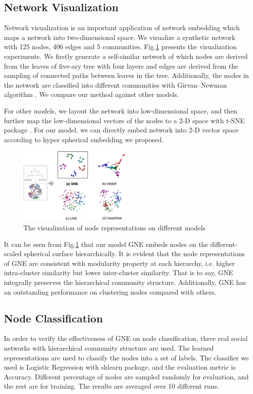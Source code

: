 \documentclass{article}
\theoremstyle{definition}
\begin{document}
	\subsection{Network Visualization}
	Network visualization is an important application of network embedding which maps a network into two-dimensional space. We visualize a synthetic network with 125 nodes, 406 edges and 5 communities. Fig.\ref{fig:visualization} presents the visualization experiments. We firstly generate a self-similar network of which nodes are derived from the leaves of five-ary tree with four layers and edges are derived from the sampling of connected paths between leaves in the tree. Additionally, the nodes in the network are classified into different communities with Girvan–Newman algorithm \cite{girvan2002community}. We compare our method against other models.

	For other models, we layout the network into low-dimensional space, and then further map the low-dimensional vectors of the nodes to a 2-D space with t-SNE package \cite{Maaten2008Visualizing}. For our model, we can directly embed network into 2-D vector space according to hyper spherical embedding we proposed.

	\begin{figure}[htb]
		\center
		\includegraphics[width=0.5\textwidth]{figure/visualization.pdf}
		\caption{The visualization of node representations on different models}
		\label{fig:visualization}
	\end{figure}
	It can be seen from Fig.\ref{fig:visualization} that our model GNE embeds nodes on the different-scaled spherical surface hierarchically. It is evident that the node representations of GNE are consistent with modularity property at each hierarchy, i.e. higher intra-cluster similarity but lower inter-cluster similarity. That is to say, GNE integrally preserves the hierarchical community structure. Additionally, GNE has an outstanding performance on clustering nodes compared with others.
	
	

	\subsection{Node Classification}
	In order to verify the effectiveness of GNE on node classification, three real social networks with hierarchical community structure are used. The learned representations are used to classify the nodes into a set of labels. The classifier we used is Logistic Regression with sklearn package, and the evaluation metric is Accuracy. Different percentage of nodes are sampled randomly for evaluation, and the rest are for training. The results are averaged over 10 different runs. 
\end{document}
